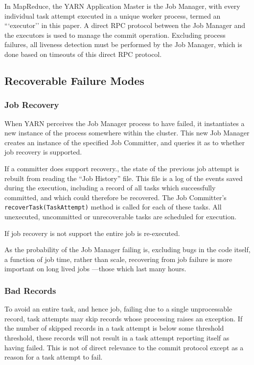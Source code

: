 \documentclass[conference]{IEEEtran}
\begin{document}
In MapReduce, the YARN Application Master is the Job Manager,
with every individual task attempt executed in a unique worker process, termed
an ```executor'' in this paper.
A direct RPC protocol between the Job Manager and the executors is used to manage
the commit operation.
Excluding process failures, all liveness detection must be performed by the
Job Manager, which is done based on timeouts of this direct RPC protocol.


\subsection{Recoverable Failure Modes}
\label{subsec:optionalRecoverableFailureModes}

\subsubsection{Job Recovery}

When YARN perceives the Job Manager process to have failed, it instantiates
a new instance of the process somewhere within the cluster.
This new Job Manager creates an instance of the specified Job Committer,
and queries it as to whether job recovery is supported.

If a committer does support recovery.,
the state of the previous job attempt is rebuilt from reading the
``Job History'' file.
This file is a log of the events saved during the execution, including
a record of all tasks which successfully committed, and which could
therefore be recovered.
The Job Committer's \texttt{recoverTask(TaskAttempt)} method is called
for each of these tasks.
All unexecuted, uncommitted or unrecoverable tasks are scheduled for execution.

If job recovery is not support the entire job is re-executed.

As the probability of the Job Manager failing is, excluding bugs in the code itself,
a function of job time, rather than scale, recovering from job failure is more
important on long lived jobs ---those which last many hours.

\subsubsection{Bad Records}

To avoid an entire task, and hence job, failing due to a single unprocessable record,
task attempts may skip records whose processing raises an exception.
If the number of skipped records in a task attempt is below some threshold
threshold, these records will not result in a task attempt reporting itself as
having failed.
This is not of direct relevance to the commit protocol except as a
reason for a task attempt to fail.
\end{document}
